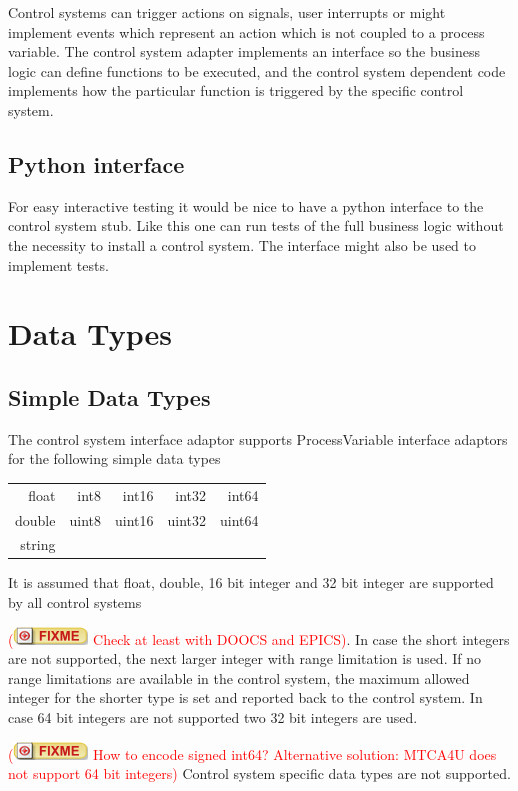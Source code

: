 \documentclass[11pt,a4paper]{scrartcl}
\newcounter{nFixmes}
\newcommand{\fixme}[1]{\addtocounter{nFixmes}{1}\textcolor{red}{(\includegraphics[height=2ex]{fixme} #1)}\xspace}
\begin{document}
Control systems can trigger actions on signals, user interrupts or might implement events which represent an action which is not coupled to a process variable. The control system adapter implements an interface so the business logic can define functions to be executed, and the control system dependent code implements how the particular function is triggered by the specific control system.

\subsection{Python interface}

For easy interactive testing it would be nice to have a python interface to the control system stub. Like this one can run tests of the full business logic without the necessity to install a control system. The interface might also be used to implement tests.

\section{Data Types}

\subsection{Simple Data Types}

The control system interface adaptor supports ProcessVariable interface adaptors for the following simple data types\\[2ex]
\begin{tabular}{rrrrr}
float & int8 & int16 & int32 & int64\\
double & uint8 & uint16 & uint32 & uint64 \\
string\\[2ex]
\end{tabular}

It is assumed that float, double, 16 bit integer and 32 bit integer are supported by all control systems \fixme{Check at least with DOOCS and EPICS}. In case the short integers are not supported, the next larger integer with range limitation is used. If no range limitations are available in the control system, the maximum allowed integer for the shorter type is set and reported back to the control system. In case 64 bit integers are not supported two 32 bit integers are used. \fixme{How to encode signed int64? Alternative solution: MTCA4U does not support 64 bit integers}
Control system specific data types are not supported.
\end{document}
